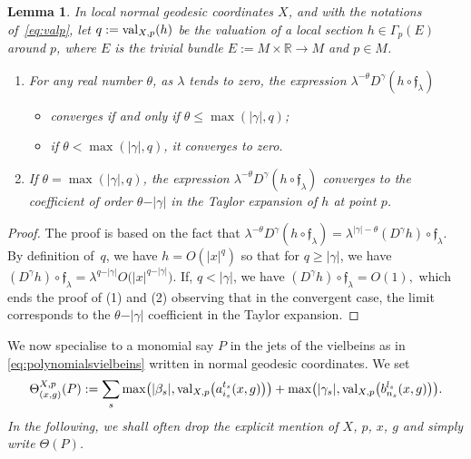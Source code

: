 \documentclass[10pt,a4paper]{amsart}
\numberwithin{equation}{section}
\newtheorem{lem}[thm]{Lemma}
\theoremstyle{definition}
\newcommand{\R}{\mathbb R}
\begin{document}
\begin{lem}\label{lem:lambdadeltaB}
	In local normal geodesic coordinates $X$, and with the notations of~\eqref{eq:valp}, let
$	q:={\rm val}_{X,p} (h)$ be the valuation of a local section $h\in \Gamma_p(E)$ around $p$, where $E$ is the trivial bundle $E:=M\times\R\to M$ and $p\in M$.
	\begin{enumerate}\itemsep=0pt
		\item[$1.$] For any real number $\theta$, as $\lambda$ tends to zero, the expression $ \lambda^{-\theta}D^\gamma(h\circ \mathfrak{f}_\lambda)$
		\begin{itemize}\itemsep=0pt
			\item converges if and only if $ \theta\leq \max (\vert\gamma\vert, q)$;
			\item if $\theta <\max (\vert\gamma\vert, q)$, it converges to zero.
		\end{itemize}
		\item[$2.$] If $\theta=\max (\vert\gamma\vert, q)$, the expression $ \lambda^{-\theta}D^\gamma(h\circ \mathfrak{f}_\lambda)$ converges to the coefficient of order $\theta-\vert \gamma\vert$ in the Taylor expansion of $h$ at point $p$.
	\end{enumerate}
\end{lem}
\begin{proof} The proof is based on the fact that $\lambda^{-\theta}D^\gamma(h\circ\mathfrak{f}_\lambda)=\lambda^{\vert\gamma\vert-\theta} (D^\gamma h)\circ \mathfrak{f}_\lambda$. By definition of~$q$, we have $h=O(\vert x\vert^q)$ so that for $q\geq \vert\gamma\vert$, we have $ (D^\gamma h)\circ \mathfrak{f}_\lambda =\lambda^{q-\vert\gamma\vert}O\bigl(\vert x\vert^{q-\vert\gamma\vert}\bigr)$. If, $q< \vert\gamma\vert$, we have $(D^\gamma h)\circ \mathfrak{f}_\lambda =O(1),$ which ends the proof of (1) and (2) observing that in the convergent case, the limit corresponds to the $\theta-\vert \gamma \vert$ coefficient in the Taylor expansion.
\end{proof}

 We now specialise to a monomial {say $P$} in the jets of the vielbeins as in \eqref{eq:polynomialsvielbeins} written in normal geodesic coordinates. We set
 \begin{equation*} %
 \Theta^{X, p}_{(x, g)}{(P)}:={\sum_s \max \bigl(|\beta_s|, {\rm val}_{X,p}\bigl(a_{i_s}^{t_s}(x,g)\bigr)\bigr)+ \max \bigl(|\gamma_s|, {\rm val}_{X,p}\bigl(b_{n_s}^{l_s}(x,g) \bigr)\bigr)}.
\end{equation*}
{\it In the following, we shall often drop the explicit mention of $X$, $p$, $x$, $g$ and simply write $\Theta (P)$.}
\end{document}
